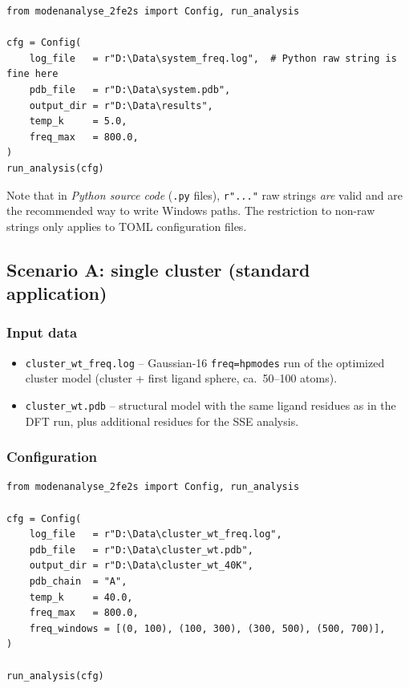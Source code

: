 \documentclass[11pt,a4paper,twoside]{article}
\theoremstyle{remark}
\begin{document}
\begin{lstlisting}[style=python]
from modenanalyse_2fe2s import Config, run_analysis

cfg = Config(
    log_file   = r"D:\Data\system_freq.log",  # Python raw string is fine here
    pdb_file   = r"D:\Data\system.pdb",
    output_dir = r"D:\Data\results",
    temp_k     = 5.0,
    freq_max   = 800.0,
)
run_analysis(cfg)
\end{lstlisting}

Note that in \emph{Python source code} (\texttt{.py} files),
\texttt{r"..."} raw strings \emph{are} valid and are the recommended
way to write Windows paths. The restriction to non-raw strings only
applies to TOML configuration files.

\subsection{Scenario A: single cluster (standard application)}
\label{sec:workflow-single}

\subsubsection*{Input data}

\begin{itemize}
  \item \texttt{cluster\_wt\_freq.log} -- Gaussian-16
        \texttt{freq=hpmodes} run of the optimized cluster model
        (cluster + first ligand sphere, ca.\ 50--100 atoms).
  \item \texttt{cluster\_wt.pdb} -- structural model with the same
        ligand residues as in the DFT run, plus additional
        residues for the SSE analysis.
\end{itemize}

\subsubsection*{Configuration}

\begin{lstlisting}[style=python]
from modenanalyse_2fe2s import Config, run_analysis

cfg = Config(
    log_file   = r"D:\Data\cluster_wt_freq.log",
    pdb_file   = r"D:\Data\cluster_wt.pdb",
    output_dir = r"D:\Data\cluster_wt_40K",
    pdb_chain  = "A",
    temp_k     = 40.0,
    freq_max   = 800.0,
    freq_windows = [(0, 100), (100, 300), (300, 500), (500, 700)],
)

run_analysis(cfg)
\end{lstlisting}
\end{document}
